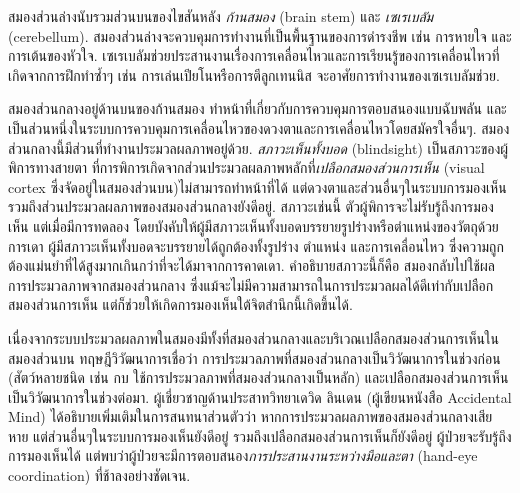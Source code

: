 {\begin{shaded}
สมองส่วนล่างนับรวมส่วนบนของไขสันหลัง \textit{ก้านสมอง} (brain stem) และ \textit{เซเรเบลัม} (cerebellum).
สมองส่วนล่างจะควบคุมการทำงานที่เป็นพื้นฐานของการดำรงชีพ เช่น การหายใจ และการเต้นของหัวใจ.
เซเรเบลัมช่วยประสานงานเรื่องการเคลื่อนไหวและการเรียนรู้ของการเคลื่อนไหวที่เกิดจากการฝึกทำซ้ำๆ เช่น 
การเล่นเปียโนหรือการตีลูกเทนนิส จะอาศัยการทำงานของเซเรเบลัมช่วย.

สมองส่วนกลางอยู่ด้านบนของก้านสมอง ทำหน้าที่เกี่ยวกับการควบคุมการตอบสนองแบบฉับพลัน และเป็นส่วนหนึ่งในระบบการควบคุมการเคลื่อนไหวของดวงตาและการเคลื่อนไหวโดยสมัครใจอื่นๆ.
สมองส่วนกลางนี้มีส่วนที่ทำงานประมวลผลภาพอยู่ด้วย.
\textit{สภาวะเห็นทั้งบอด} (blindsight) เป็นสภาวะของผู้พิการทางสายตา ที่การพิการเกิดจากส่วนประมวลผลภาพหลักที่\textit{เปลือกสมองส่วนการเห็น} (visual cortex ซึ่งจัดอยู่ในสมองส่วนบน)ไม่สามารถทำหน้าที่ได้ แต่ดวงตาและส่วนอื่นๆในระบบการมองเห็น รวมถึงส่วนประมวลผลภาพของสมองส่วนกลางยังดีอยู่.
สภาวะเช่นนี้ ตัวผู้พิการจะไม่รับรู้ถึงการมองเห็น 
แต่เมื่อมีการทดลอง
โดยบังคับให้ผู้มีสภาวะเห็นทั้งบอดบรรยายรูปร่างหรือตำแหน่งของวัตถุด้วยการเดา
ผู้มีสภาวะเห็นทั้งบอดจะบรรยายได้ถูกต้องทั้งรูปร่าง ตำแหน่ง และการเคลื่อนไหว
ซึ่งความถูกต้องแม่นยำที่ได้สูงมากเกินกว่าที่จะได้มาจากการคาดเดา.
คำอธิบายสภาวะนี้ก็คือ สมองกลับไปใช้ผลการประมวลภาพจากสมองส่วนกลาง ซึ่งแม้จะไม่มีความสามารถในการประมวลผลได้ดีเท่ากับเปลือกสมองส่วนการเห็น
แต่ก็ช่วยให้เกิดการมองเห็นใต้จิตสำนึกนี้เกิดขึ้นได้.

เนื่องจากระบบประมวลผลภาพในสมองมีทั้งที่สมองส่วนกลางและบริเวณเปลือกสมองส่วนการเห็นในสมองส่วนบน ทฤษฎีวิวัฒนาการเชื่อว่า
การประมวลภาพที่สมองส่วนกลางเป็นวิวัฒนาการในช่วงก่อน
(สัตว์หลายชนิด เช่น กบ ใช้การประมวลภาพที่สมองส่วนกลางเป็นหลัก)
และเปลือกสมองส่วนการเห็นเป็นวิวัฒนาการในช่วงต่อมา.
ผู้เชี่ยวชาญด้านประสาทวิทยาเดวิด ลินเดน (ผู้เขียนหนังสือ 
Accidental Mind\cite{Linden2008a}) ได้อธิบายเพิ่มเติมในการสนทนาส่วนตัวว่า
หากการประมวลผลภาพของสมองส่วนกลางเสียหาย แต่ส่วนอื่นๆในระบบการมองเห็นยังดีอยู่ รวมถึงเปลือกสมองส่วนการเห็นก็ยังดีอยู่
ผู้ป่วยจะรับรู้ถึงการมองเห็นได้ แต่พบว่าผู้ป่วยจะมีการตอบสนอง\textit{การประสานงานระหว่างมือและตา} (hand-eye coordination) ที่ช้าลงอย่างชัดเจน.




\end{shaded}}
